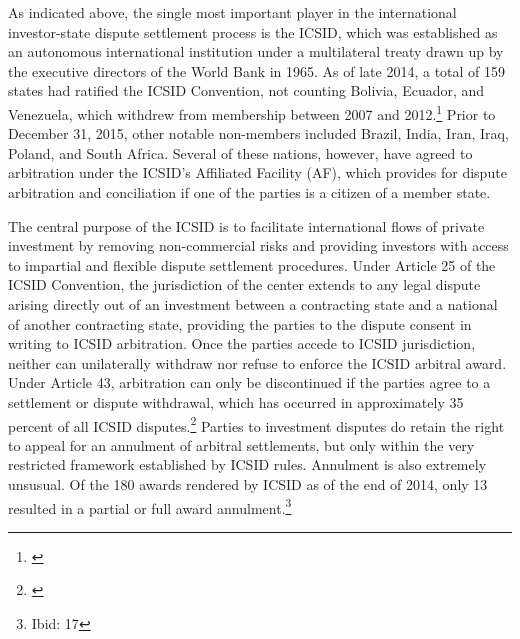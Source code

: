 \documentclass[12pt,onesided]{amsart}
\begin{document}
As indicated above, the single most important player in the international investor-state dispute settlement process is the ICSID, which was established as an autonomous international institution under a multilateral treaty drawn up by the executive directors of the World Bank in 1965. As of late 2014, a total of 159 states had ratified the ICSID Convention, not counting Bolivia, Ecuador, and Venezuela, which withdrew from membership between 2007 and 2012.\footnote{\citet{icsid:2014b}}  Prior to December 31, 2015, other notable non-members included Brazil, India, Iran, Iraq, Poland, and South Africa. Several of these nations, however, have agreed to arbitration under the ICSID's Affiliated Facility (AF), which provides for dispute arbitration and conciliation if one of the parties is a citizen of a member state. 

The central purpose of the ICSID is to facilitate international flows of private investment by removing non-commercial risks and providing investors with access to impartial and flexible dispute settlement procedures. Under Article 25 of the ICSID Convention, the jurisdiction of the center extends to any legal dispute arising directly out of an investment between a contracting state and a national of another contracting state, providing the parties to the dispute consent in writing to ICSID arbitration. Once the parties accede to ICSID jurisdiction, neither can unilaterally withdraw nor refuse to enforce the ICSID arbitral award. Under Article 43, arbitration can only be discontinued if the parties agree to a settlement or dispute withdrawal, which has occurred in approximately 35 percent of all ICSID disputes.\footnote{\citet[p. 17]{icsid:2015}} Parties to investment disputes do retain the right to appeal for an annulment of arbitral settlements, but only within the very restricted framework established by ICSID rules. Annulment is also extremely unsusual. Of the 180 awards rendered by ICSID as of the end of 2014, only 13 resulted in a partial or full award annulment.\footnote{Ibid: 17}
\end{document}
